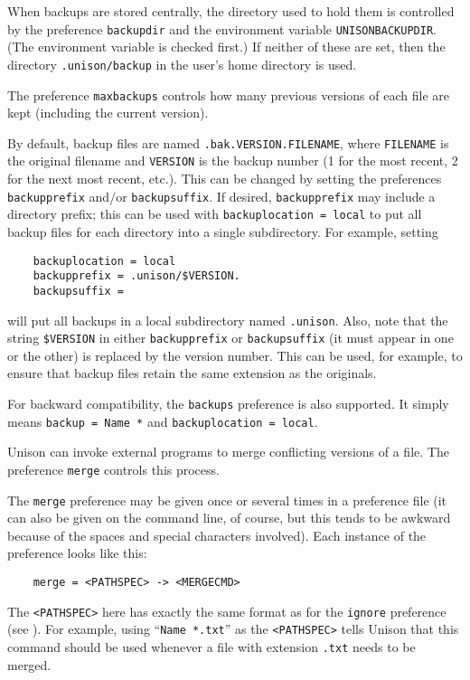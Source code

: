 \documentclass{article}
\begin{document}
When backups are stored centrally, the directory used to hold them is
controlled by the preference \verb|backupdir| and the
environment variable \verb|UNISONBACKUPDIR|.  (The environment variable is
checked first.)  If neither of these are set, then the directory
\verb|.unison/backup| in the user's home directory is used.

The preference \verb|maxbackups| controls how many previous versions of
each file are kept (including the current version).  

By default, backup files are named \verb|.bak.VERSION.FILENAME|,
where \verb|FILENAME| is the original filename and \verb|VERSION| is the
backup number (1 for the most recent, 2 for the next most recent,
etc.).  This can be changed by setting the preferences \verb|backupprefix|
and/or \verb|backupsuffix|.  If desired, \verb|backupprefix| may include a
directory prefix; this can be used with \verb|backuplocation = local| to put all
backup files for each directory into a single subdirectory.  For example, setting
\begin{verbatim}
    backuplocation = local
    backupprefix = .unison/$VERSION.
    backupsuffix = 
\end{verbatim}
will put all backups in a local subdirectory named \verb|.unison|.  Also,
note that the string \verb|$VERSION| in either \verb|backupprefix| or
\verb|backupsuffix| (it must appear in one or the other) is replaced by
the version number.  This can be used, for example, to ensure that backup
files retain the same extension as the originals.

For backward compatibility, the \verb|backups| preference is also supported.
%
It simply means \verb|backup = Name *| and \verb|backuplocation = local|.



Unison can invoke external programs to merge conflicting versions of a file.
The preference \verb|merge| controls this process.  

The \verb|merge| preference may be given once or several times in a
preference file (it can also be given on the command line, of course, but
this tends to be awkward because of the spaces and special characters
involved).  Each instance of the preference looks like this:
\begin{verbatim}
    merge = <PATHSPEC> -> <MERGECMD>
\end{verbatim}
The \verb|<PATHSPEC>| here has exactly the same format as for the
\verb|ignore| preference (see ).  For example,
using ``\verb|Name *.txt|'' as the \verb|<PATHSPEC>| tells Unison that this
command should be used whenever a file with extension \verb|.txt| needs to
be merged.  
\end{document}
